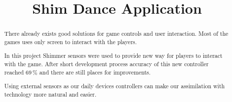 \documentclass[conference]{IEEEtran}
\begin{document}
%
\title{Shim Dance Application}


\author{
}


% 








\maketitle


\begin{abstract}
There already exists good solutions for game controls and user interaction.
Most of the games uses only screen to interact with the players.

In this project Shimmer sensors were used to provide new way for players to interact with the game.
After short development process accuracy of this new controller reached 69\,\% and there are still places for improvements.

Using external sensors as our daily devices controllers can make our assimilation with technology more natural and easier.
\end{abstract}
\end{document}

